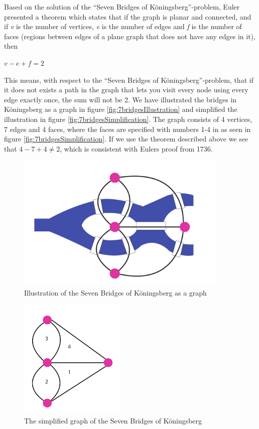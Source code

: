 Based on the solution of the ``Seven Bridges of Köningsberg''-problem, Euler presented a theorem which states that if the graph is planar and connected, and if \textit{v} is the number of vertices, \textit{e} is the number of edges and \textit{f} is the number of faces (regions between edges of a plane graph that does not have any edges in it), then 
\newline
\newline
\centerline{$v-e+f=2$}
\newline
\newline
This means, with respect to the ``Seven Bridges of Köningsberg''-problem, that if it does not exists a path in the graph that lets you visit every node using every edge exactly once, the sum will not be 2. We have illustrated the bridges in Köningsberg as a graph in figure \vref{fig:7bridgesIllustration} and simplified the illustration in figure \vref{fig:7bridgesSimplification}. The graph consists of 4 vertices, 7 edges and 4 faces, where the faces are specified with numbers 1-4 in as seen in figure \vref{fig:7bridgesSimplification}. If we use the theorem described above we see that $4-7+4\neq2$, which is consistent with Eulers proof from 1736. 

\begin{figure}[H]
  \centering
  \includegraphics[width=4in]{assets/7bridges.pdf}
  \caption{Illustration of the Seven Bridges of Köningsberg as a graph}
  \label{fig:7bridgesIllustration}
\end{figure}

\begin{figure}[H]
  \centering
  \includegraphics[width=2in]{assets/7bridges2.pdf}
  \caption{The simplified graph of the Seven Bridges of Köningsberg} 
  \label{fig:7bridgesSimplification}
\end{figure}

